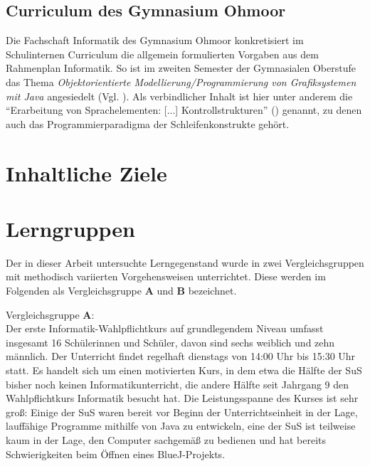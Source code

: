 \documentclass[paper=a4, DIV=13, BCOR=12mm, twoside=on, onecolumn=on, open = any, titlepage =on, parskip =half-, headsepline = on, footsepline = on, chapterprefix = on, sectionprefix = on, appendixprefix = off, fontsize = 11pt, numbers = noenddot, abstract = off]{scrreprt}
\begin{document}
\par \singlespacing
\subsection{Curriculum des Gymnasium Ohmoor}
\onehalfspacing
Die Fachschaft Informatik des Gymnasium Ohmoor konkretisiert im Schulinternen Curriculum die allgemein formulierten Vorgaben aus dem Rahmenplan Informatik. So ist im zweiten Semester der Gymnasialen Oberstufe das Thema \textit{Objektorientierte Modellierung/Programmierung von Grafiksystemen mit Java} angesiedelt (Vgl. \cite[S.6f.]{ohmoor:16}). Als verbindlicher Inhalt ist hier unter anderem die "`Erarbeitung von Sprachelementen: [...] Kontrollstrukturen"' (\cite[S.7]{ohmoor:16}) genannt, zu denen auch das Programmierparadigma der Schleifenkonstrukte gehört.




\par \singlespacing
 \section{Inhaltliche Ziele}
\onehalfspacing



\par \singlespacing
 \section{Lerngruppen}
\onehalfspacing
Der in dieser Arbeit untersuchte Lerngegenstand wurde in zwei Vergleichsgruppen mit methodisch variierten Vorgehensweisen unterrichtet. Diese werden im Folgenden als Vergleichsgruppe \textsc{\textbf{A}} und \textsc{\textbf{B}} bezeichnet.

Vergleichsgruppe \textsc{\textbf{A}}:\\
Der erste Informatik-Wahlpflichtkurs auf grundlegendem Niveau umfasst insgesamt 16 Schülerinnen und Schüler, davon sind sechs weiblich und zehn männlich. Der Unterricht findet regelhaft dienstags von 14:00 Uhr bis 15:30 Uhr statt. 
Es handelt sich um einen motivierten Kurs, in dem etwa die Hälfte der SuS bisher noch keinen Informatikunterricht, die andere Hälfte seit Jahrgang 9 den Wahlpflichtkurs Informatik besucht hat.
Die Leistungsspanne des Kurses ist sehr groß: Einige der SuS waren bereit vor Beginn der Unterrichtseinheit in der Lage, lauffähige Programme mithilfe von Java zu entwickeln, eine der SuS ist teilweise kaum in der Lage, den Computer sachgemäß zu bedienen und hat bereits Schwierigkeiten beim Öffnen eines BlueJ-Projekts.
\end{document}
